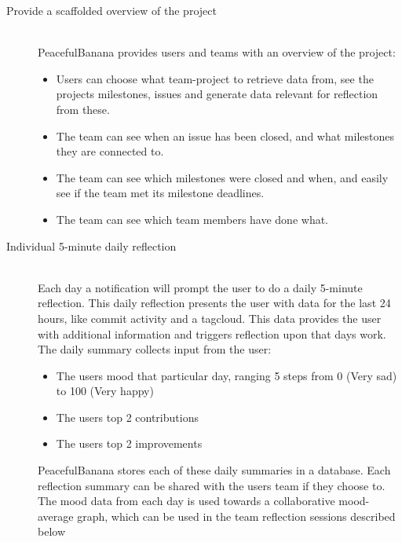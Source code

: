 \begin{description}
	\item[Provide a scaffolded overview of the project] \hfill \\
	PeacefulBanana provides users and teams with an overview of the project:
	\begin{itemize}
		\item Users can choose what team-project to retrieve data from, see the projects milestones, issues and generate data relevant for reflection from these.
		\item The team can see when an issue has been closed, and what milestones they are connected to.
		\item The team can see which milestones were closed and when, and easily see if the team met its milestone deadlines. 
		\item The team can see which team members have done what.
	\end{itemize}

	\item[Individual 5-minute daily reflection] \hfill \\
	Each day a notification will prompt the user to do a daily 5-minute reflection. This daily reflection presents the user with data for the last 24 hours, like commit activity and a tagcloud. This data provides the user with additional information and triggers reflection upon that days work. The daily summary collects input from the user:
	\begin{itemize}
		\item The users mood that particular day, ranging 5 steps from 0 (Very sad) to 100 (Very happy)
		\item The users top 2 contributions
		\item The users top 2 improvements
	\end{itemize}
	PeacefulBanana stores each of these daily summaries in a database. Each reflection summary can be shared with the users team if they choose to. The mood data from each day is used towards a collaborative mood-average graph, which can be used in the team reflection sessions described below


\end{description}
